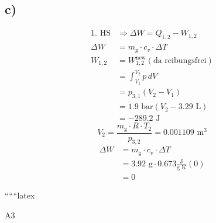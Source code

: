 

\subsection*{c)}
\begin{align*}
    \text{1. HS} &\Rightarrow \Delta W = Q_{1,2} - W_{1,2} \\
    \Delta W &= m_{\text{g}} \cdot c_v \cdot \Delta T \\
    W_{1,2} &= W_{1,2}^{\text{new}} (\text{da reibungsfrei}) \\
    &= \int_{V_1}^{V_2} p \, dV \\
    &= p_{3,1} (V_2 - V_1) \\
    &= 1.9 \text{ bar} (V_2 - 3.29 \text{ L}) \\
    &= -289.2 \text{ J}
\end{align*}
\[
V_2 = \frac{m_{\text{g}} \cdot R \cdot T_2}{p_{3,2}} = 0.001109 \text{ m}^3
\]
\begin{align*}
    \Delta W &= m_{\text{g}} \cdot c_v \cdot \Delta T \\
    &= 3.92 \text{ g} \cdot 0.673 \frac{\text{J}}{\text{g K}} (0) \\
    &= 0
\end{align*}

``````latex


A3
